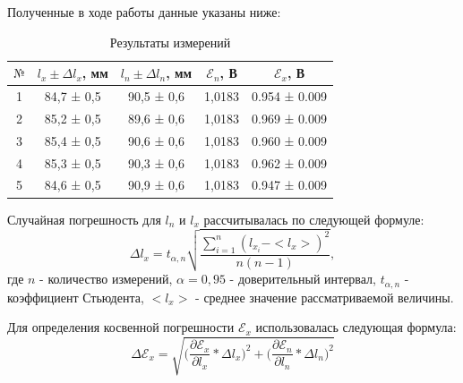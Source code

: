 \documentclass[a4paper,12pt]{article}
\begin{document}
Полученные в ходе работы данные указаны ниже:
\begin{table}[!h]
\begin{center}
	\begin{tabular}{|c|c|c|c|c|}
		\hline
		$№$&$l_x \pm\Delta l_x$, мм&$l_n \pm\Delta l_n$, мм&$\mathcal{E}_n$, В&$\mathcal{E}_x$, В
		\\ 
		\hline
		1	&84,7	 ± 0,5 & 	 90,5 ± 0,6 	&1,0183	& 0.954 ± 0.009
		\\
		\hline
		2	&85,2	 ± 0,5 &	 89,6 ± 0,6		&1,0183	& 0.969 ± 0.009
		\\
		\hline
		3	&85,4	 ± 0,5 &	 90,6 ± 0,6		&1,0183	& 0.960 ± 0.009
		\\
		\hline
		4	&85,3	 ± 0,5 & 	90,3 ± 0,6		&1,0183	& 0.962 ± 0.009
		\\
		\hline
		5	&84,6	 ± 0,5 & 	90,9 ± 0,6		&1,0183 	& 0.947 ± 0.009
		\\
		\hline	
	\end{tabular}
	\caption{Результаты измерений}
	\end{center}
\end{table}

Случайная погрешность для $l_n$ и $l_x$ рассчитывалась по следующей формуле:
$$\Delta l_x = t_{\alpha,n}\sqrt{\frac{\sum_{i=1}^n(l_{x_i} - <l_x>)^2}{n(n-1)}},$$
где $n$ - количество измерений, $\alpha = 0,95$ - доверительный интервал, $t_{\alpha,n}$ - коэффициент Стьюдента, $<l_x>$ - среднее значение рассматриваемой величины.

Для определения косвенной погрешности $\mathcal{E}_x$ использовалась следующая формула:
$$ \Delta \mathcal{E}_x = \sqrt{\bigg(\frac{\partial\mathcal{E}_x}{\partial l_x}*\Delta l_x\bigg)^2 + \bigg(\frac{\partial\mathcal{E}_n}{\partial l_n}*\Delta l_n\bigg)^2}$$
\end{document}
